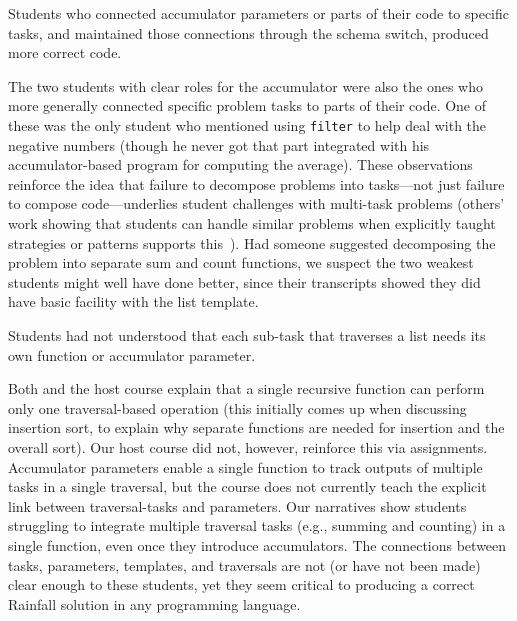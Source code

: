 \begin{obs}
  Students who connected accumulator parameters or parts of their code to
  specific tasks, and maintained those connections through the schema
  switch, produced more correct code.
\end{obs}
 
The two students with clear roles for the accumulator were also the
ones who more generally connected specific problem tasks to parts of
their code.  One of these was the only student who mentioned using
\lstinline{filter} to help deal with the negative numbers (though he
never got that part integrated with his accumulator-based program for
computing the average).  These observations reinforce the idea that
failure to decompose problems into tasks---not just failure to compose
code---underlies student challenges with multi-task problems (others'
work showing that students can handle similar problems when explicitly
taught strategies or patterns supports this~\cite{deraadt-watson-toleman-strategies-ace09,muller-ginat-pattern-oriented-instruction07}).  Had someone
suggested decomposing the problem into separate sum and count
functions, we suspect the two weakest students might well have done
better, since their transcripts showed they did have basic facility
with the list template.


\begin{obs}
Students had not understood that each sub-task that traverses a
list needs its own function or accumulator parameter.
\end{obs}

Both \htdp and the host course explain that a single recursive
function can perform only one traversal-based operation (this
initially comes up when discussing insertion sort, to explain why
separate functions are needed for insertion and the overall sort). Our
host course did not, however, reinforce this via
assignments.  Accumulator parameters enable a single function to track
outputs of multiple tasks in a single traversal, but the course does
not currently teach the explicit link between traversal-tasks and
parameters.  Our narratives show students struggling to integrate
multiple traversal tasks (e.g., summing and counting) in a single
function, even once they introduce accumulators.  The connections
between tasks, parameters, templates, and traversals are not (or have not been
made) clear enough to these students, yet they seem critical to
producing a correct Rainfall solution in any programming language.

